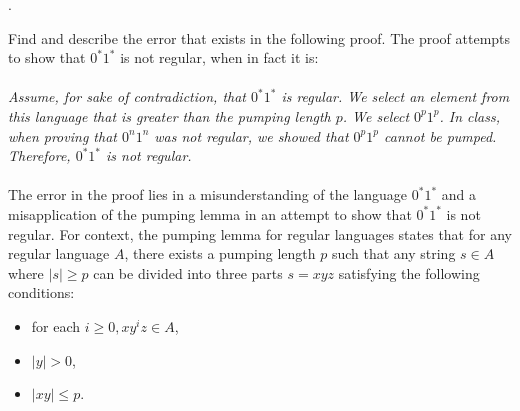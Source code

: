 \documentclass[12pt]{article}
\newcounter{quesnum}
\newcommand{\question}[2][??]{
\begin{list}{\labelitemi}{\leftmargin=2em}
\item [\arabic{quesnum}.] {} {#2}
\end{list}
\addtocounter{quesnum}{1}
}
\begin{document}
\question[3]{
Find and describe the error that exists in the following proof. The proof attempts to show that $0^*1^*$ is not regular, when in fact it is:
\\
\\
\emph{
Assume, for sake of contradiction, that $0^*1^*$ is regular. We select an element from this language that is greater than the pumping length $p$. We select $0^p1^p$. In class, when proving that $0^n1^n$ was not regular, we showed that $0^p1^p$ cannot be pumped. Therefore, $0^*1^*$ is not regular.
}
\\
\\
The error in the proof lies in a misunderstanding of the language $0^*1^*$ and a misapplication of the pumping lemma in an attempt to show that $0^*1^*$ is not regular. For context, the pumping lemma for regular languages states that for any regular language $A$, there exists a pumping length $p$ such that any string $s \in A$ where $|s| \geq p$ can be divided into three parts $s = xyz$ satisfying the following conditions:
\begin{itemize}
    \item for each $i \geq 0, xy^iz \in A$,
    \item $|y| > 0$,
    \item $|xy| \leq p$.
\end{itemize}

}
\end{document}

